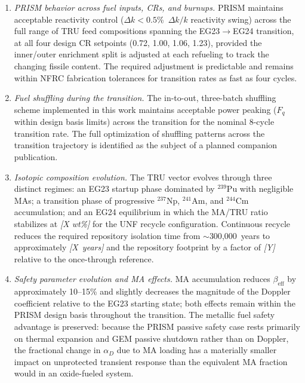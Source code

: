\documentclass[10pt,twoside]{article}
\newcommand{\placeholder}[1]{%
  \textcolor{placeholder}{\textit{[#1]}}}
\begin{document}
\begin{enumerate}
  \item \textit{PRISM behavior across fuel inputs, CRs, and burnups.}
        PRISM maintains acceptable reactivity control
        ($\Delta k < 0.5$\%~$\Delta k/k$ reactivity swing) across
        the full range of TRU feed compositions spanning the
        EG23$\rightarrow$EG24 transition, at all four design CR
        setpoints (0.72, 1.00, 1.06, 1.23), provided the inner/outer
        enrichment split is adjusted at each refueling to track the
        changing fissile content.  The required adjustment is
        predictable and remains within NFRC fabrication tolerances
        for transition rates as fast as four cycles.

  \item \textit{Fuel shuffling during the transition.}
        The in-to-out, three-batch shuffling scheme implemented in
        this work maintains acceptable power peaking ($F_q$ within
        design basis limits) across the transition for the nominal
        8-cycle transition rate.  The full optimization of shuffling
        patterns across the transition trajectory is identified as
        the subject of a planned companion publication.

  \item \textit{Isotopic composition evolution.}
        The TRU vector evolves through three distinct regimes: an
        EG23 startup phase dominated by $^{239}$Pu with negligible
        MAs; a transition phase of progressive $^{237}$Np, $^{241}$Am,
        and $^{244}$Cm accumulation; and an EG24 equilibrium in which
        the MA/TRU ratio stabilizes at \placeholder{X wt\%} for the
        UNF recycle configuration.  Continuous recycle reduces the
        required repository isolation time from $\sim$300{,}000~years
        to approximately \placeholder{X~years} and the repository
        footprint by a factor of \placeholder{Y} relative to the
        once-through reference.

  \item \textit{Safety parameter evolution and MA effects.}
        MA accumulation reduces $\beta_\text{eff}$ by approximately
        10--15\% and slightly decreases the magnitude of the Doppler
        coefficient relative to the EG23 starting state; both effects
        remain within the PRISM design basis throughout the transition.
        The metallic fuel safety advantage is preserved: because the
        PRISM passive safety case rests primarily on thermal expansion
        and GEM passive shutdown rather than on Doppler, the fractional
        change in $\alpha_D$ due to MA loading has a materially smaller
        impact on unprotected transient response than the equivalent MA
        fraction would in an oxide-fueled system.


\end{enumerate}
\end{document}
